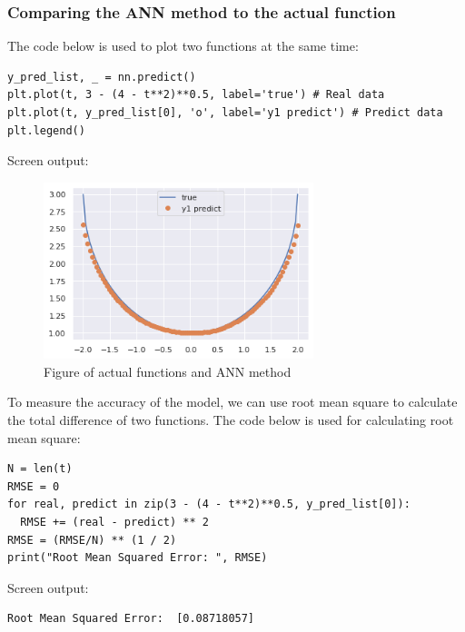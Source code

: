 \documentclass[a4paper]{article}
\numberwithin{equation}{section}
\begin{document}
\subsubsection{Comparing the ANN method to the actual function}
The code below is used to plot two functions at the same time:
\begin{mdframed}[leftline=false,rightline=false,backgroundcolor=magenta!10,nobreak=true]
  \begin{verbatim}
y_pred_list, _ = nn.predict()
plt.plot(t, 3 - (4 - t**2)**0.5, label='true') # Real data
plt.plot(t, y_pred_list[0], 'o', label='y1 predict') # Predict data
plt.legend()
    \end{verbatim}
\end{mdframed}
Screen output:
\begin{figure}[H]
  \centering
  \includegraphics[width=0.7\textwidth]{ODEplot.png}
  \caption{Figure of actual functions and ANN method}
\end{figure}

To measure the accuracy of the model, we can use root mean square to calculate the total difference of two functions. The code below is used for calculating root mean square:
\begin{mdframed}[leftline=false,rightline=false,backgroundcolor=magenta!10,nobreak=true]
  \begin{verbatim}
N = len(t)
RMSE = 0
for real, predict in zip(3 - (4 - t**2)**0.5, y_pred_list[0]):
  RMSE += (real - predict) ** 2
RMSE = (RMSE/N) ** (1 / 2)
print("Root Mean Squared Error: ", RMSE)
    \end{verbatim}
\end{mdframed}
Screen output:
\begin{mdframed}[leftline=false,rightline=false,backgroundcolor=Turquoise!10,nobreak=true]
  \begin{verbatim}
Root Mean Squared Error:  [0.08718057]
    \end{verbatim}
\end{mdframed}
\end{document}
